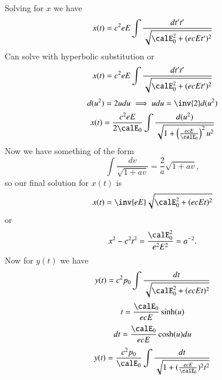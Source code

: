 {Solving for \(x\) we have
%
\begin{equation}\label{eqn:relativisticElectrodynamicsT3:220}
x(t) = c^2 e E \int \frac{dt' t'}{\sqrt{ \calE_0^2 + (e c E t')^2 }}
\end{equation}
%
Can solve with hyperbolic substitution or
%
\begin{equation}\label{eqn:relativisticElectrodynamicsT3:240}
x(t) = c^2 e E \int \frac{dt' t'}{\sqrt{ \calE_0^2 + (e c E t')^2 }}
\end{equation}
%
\begin{equation}\label{eqn:relativisticElectrodynamicsT3:260}
d(u^2) = 2 u du \implies u du = \inv{2} d(u^2)
\end{equation}
%
\begin{equation}\label{eqn:relativisticElectrodynamicsT3:280}
x(t) = \frac{c^2 e E}{2 \calE_0} \int \frac{d (u^2)}{\sqrt{ 1 + \left(\frac{e c E}{\calE_0}\right)^2 u^2 }}
\end{equation}
%
Now we have something of the form
%
\begin{equation}\label{eqn:relativisticElectrodynamicsT3:290}
\int \frac{d v}{\sqrt{1 + a v}} = \frac{2}{a} \sqrt{1 + a v},
\end{equation}
%
so our final solution for \(x(t)\) is
%
\begin{equation}\label{eqn:relativisticElectrodynamicsT3:300}
x(t) = \inv{e E} \sqrt{ \calE_0^2 + (e c E t)^2 }
\end{equation}
%
or
%
\begin{equation}\label{eqn:relativisticElectrodynamicsT3:320}
x^2 - c^2 t^2 = \frac{\calE_0^2}{ e^2 E^2 } = a^{-2}.
\end{equation}
%
Now for \(y(t)\) we have
%
\begin{equation}\label{eqn:relativisticElectrodynamicsT3:340}
y(t) = c^2 p_0 \int \frac{dt}{ \sqrt{\calE_0^2 + (e c E t)^2 }}
\end{equation}
%
\begin{equation}\label{eqn:relativisticElectrodynamicsT3:360}
t = \frac{\calE_0}{ e c E} \sinh(u)
\end{equation}
%
\begin{equation}\label{eqn:relativisticElectrodynamicsT3:380}
dt = \frac{\calE_0}{ e c E} \cosh(u) du
\end{equation}
%
\begin{equation}\label{eqn:relativisticElectrodynamicsT3:970}
\begin{aligned}
y(t)
&= \frac{c^2 p_0}{\calE_0} \int \frac{dt}{\sqrt{1 + (\frac{e c E}{\calE_0})^2 t^2 }} \\

\end{aligned}
\end{equation}}
